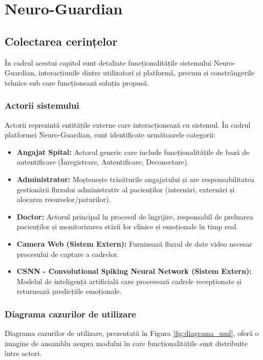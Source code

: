 \chapter{Neuro-Guardian}

\section{Colectarea cerințelor}

În cadrul acestui capitol sunt detaliate funcționalitățile sistemului Neuro-Guardian, interacțiunile dintre utilizatori și platformă, precum și constrângerile tehnice sub care funcționează soluția propusă.

\subsection*{Actorii sistemului}

Actorii reprezintă entitățile externe care interacționează cu sistemul. În cadrul platformei Neuro-Guardian, sunt identificate următoarele categorii:

\begin{itemize}[noitemsep]
    \item \textbf{Angajat Spital:} Actorul generic care include funcționalitățile de bază de autentificare (Înregistrare, Autentificare, Deconectare).
    \item \textbf{Administrator:} Moștenește trăsăturile angajatului și are responsabilitatea gestionării fluxului administrativ al pacienților (internări, externări și alocarea resurselor/paturilor).
    \item \textbf{Doctor:} Actorul principal în procesul de îngrijire, responsabil de preluarea pacienților și monitorizarea stării lor clinice și emoționale în timp real.
    \item \textbf{Camera Web (Sistem Extern):} Furnizează fluxul de date video necesar procesului de captare a cadrelor.
    \item \textbf{CSNN - Convolutional Spiking Neural Network (Sistem Extern):} Modelul de inteligență artificială care procesează cadrele recepționate și returnează predicțiile emoționale.
\end{itemize}

\subsection*{Diagrama cazurilor de utilizare}

Diagrama cazurilor de utilizare, prezentată în Figura \ref{fig:diagrama_uml}, oferă o imagine de ansamblu asupra modului în care funcționalitățile sunt distribuite între actori.

